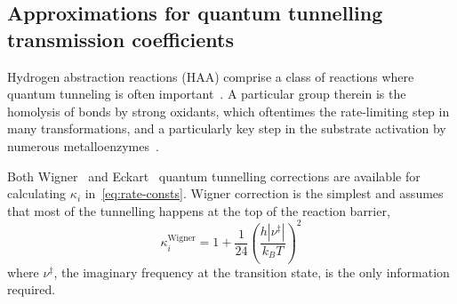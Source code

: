 \subsection{Approximations for quantum tunnelling transmission coefficients}%
\label{sec:tunneling}

Hydrogen abstraction reactions (HAA) comprise a class of reactions where
quantum tunneling is often important~\cite{Bim2018}.
A particular group therein is the homolysis of  bonds by strong
oxidants,
which oftentimes the rate-limiting step in many transformations,
and
a particularly key step in the substrate activation by numerous
metalloenzymes~\cite{Bim2018}.

Both Wigner~\cite{Wigner_1932} and Eckart~\cite{Eckart_1930} quantum tunnelling corrections are available for calculating $\kappa_i$ in~\cref{eq:rate-consts}.
Wigner correction is the simplest and assumes that most of the tunnelling happens at the top of the reaction barrier,
% 
\begin{equation}
	\kappa_i^\text{Wigner}
	= 1 + \frac{1}{24}
	\left(
	\frac{
		h | \nu^\ddagger |
	}{k_B T}
	\right)^2
\end{equation}
% 
where $\nu^\ddagger$,
the imaginary frequency at the transition state,
is the only information required.

